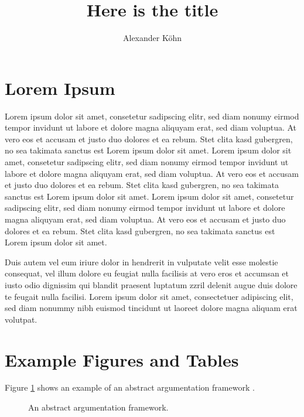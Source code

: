 \documentclass[seminar,palatino,english,m,frames]{AIGpaper}
\author{Alexander Köhn}
\title{Here is the title}
\begin{document}
\maketitle %



\section{Lorem Ipsum}
Lorem ipsum dolor sit amet, consetetur sadipscing elitr, sed diam nonumy eirmod tempor invidunt ut labore et dolore magna aliquyam erat, sed diam voluptua. At vero eos et accusam et justo duo dolores et ea rebum. Stet clita kasd gubergren, no sea takimata sanctus est Lorem ipsum dolor sit amet. Lorem ipsum dolor sit amet, consetetur sadipscing elitr, sed diam nonumy eirmod tempor invidunt ut labore et dolore magna aliquyam erat, sed diam voluptua. At vero eos et accusam et justo duo dolores et ea rebum. Stet clita kasd gubergren, no sea takimata sanctus est Lorem ipsum dolor sit amet. Lorem ipsum dolor sit amet, consetetur sadipscing elitr, sed diam nonumy eirmod tempor invidunt ut labore et dolore magna aliquyam erat, sed diam voluptua. At vero eos et accusam et justo duo dolores et ea rebum. Stet clita kasd gubergren, no sea takimata sanctus est Lorem ipsum dolor sit amet.   

Duis autem vel eum iriure dolor in hendrerit in vulputate velit esse molestie consequat, vel illum dolore eu feugiat nulla facilisis at vero eros et accumsan et iusto odio dignissim qui blandit praesent luptatum zzril delenit augue duis dolore te feugait nulla facilisi. Lorem ipsum dolor sit amet, consectetuer adipiscing elit, sed diam nonummy nibh euismod tincidunt ut laoreet dolore magna aliquam erat volutpat.   


\section{Example Figures and Tables}
Figure \ref{fig:af} shows an example of an abstract argumentation framework \cite{dung1995acceptability}.

\begin{figure}[ht]
    \centering
    \caption{An abstract argumentation framework.}
    \label{fig:af}
\end{figure}
\end{document}
